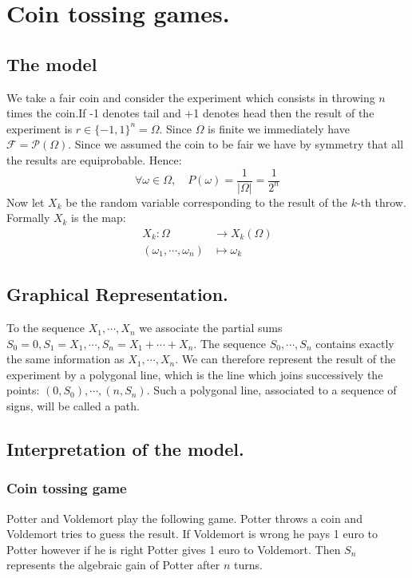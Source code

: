 \documentclass[10pt,a4paper]{book}
\theoremstyle{definition}
\begin{document}
\chapter{Coin tossing games.}

\section{The model}
We take a fair coin and consider the experiment which consists in throwing $n$ times the coin.If -1 denotes tail and +1 denotes head then the result of the experiment is $r \in \{-1, 1\}^n = \Omega$. Since $\Omega$ is finite we immediately have $\mathcal{F} = \mathcal{P}(\Omega)$. Since we assumed the coin to be fair we have by symmetry that all the results are equiprobable. Hence:
\[
\forall \omega \in \Omega, \quad P(\omega) = \frac{1}{|\Omega|} = \frac{1}{2^n}
\]
Now let $X_k$ be the random variable corresponding to the result of the $k$-th throw. Formally $X_k$ is the map:
\begin{align*}
X_k : \Omega &\longrightarrow  X_k(\Omega)\\
(\omega_1, \cdots, \omega_n) &\longmapsto \omega_k 
\end{align*}

\section{Graphical Representation.}
To the sequence $X_1, \cdots, X_n$ we associate the partial sums $S_0 = 0, S_1 = X_1, \cdots, S_n = X_1 + \cdots + X_n$. The sequence $S_0, \cdots, S_n$ contains exactly the same information as $X_1, \cdots, X_n$. We can therefore represent the result of the experiment by a polygonal line, which is the line which joins successively the points: $(0, S_0), \cdots, (n, S_n)$. Such a polygonal line, associated to a sequence of signs, will be called a path.

\section{Interpretation of the model.}
\subsection{Coin tossing game} Potter and Voldemort play the following game. Potter throws a coin and Voldemort tries to guess the result. If Voldemort is wrong he pays 1 euro to Potter however if he is right Potter gives 1 euro to Voldemort. Then $S_n$ represents the algebraic gain of Potter after $n$ turns. 
\end{document}
